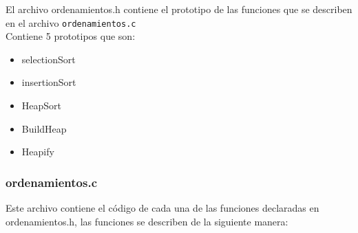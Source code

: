 \documentclass{article}
\begin{document}
			El archivo ordenamientos.h contiene el prototipo de las funciones que se describen en el archivo \verb*|ordenamientos.c|\\
			
			Contiene 5 prototipos que son:
			
			\begin{itemize}
				\item selectionSort
				\item insertionSort
				\item HeapSort
				\item BuildHeap
				\item Heapify
			\end{itemize}
			
			\subsubsection{ordenamientos.c}
			
			Este archivo contiene el código de cada una de las funciones declaradas en ordenamientos.h, las funciones se describen de la siguiente manera:
			
\end{document}
